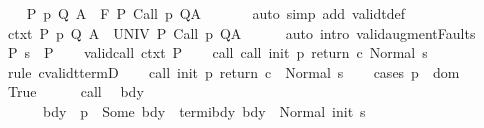 \begin{isabellebody}
\ \ \isamarkupfalse%
\ {\isachardoublequoteopen}{\isasymforall}{\isacharparenleft}P{\isacharcomma}\ p{\isacharcomma}\ Q{\isacharcomma}\ A{\isacharparenright}{\isasymin}{\isasymTheta}{\isachardot}\ {\isasymGamma}\ {\isasymTurnstile}\isactrlbsub {\isacharslash}F\isactrlesub \ P\ {\isacharparenleft}Call\ p{\isacharparenright}\ Q{\isacharcomma}A{\isachardoublequoteclose}\ \isanewline
\ \ \ \ \isamarkupfalse%
\ {\isacharparenleft}auto\ simp\ add{\isacharcolon}\ validt{\isacharunderscore}def{\isacharparenright}\isanewline
\ \ \isamarkupfalse%
\ \isamarkupfalse%
\ ctxt{\isacharprime}{\isacharcolon}\ {\isachardoublequoteopen}{\isasymforall}{\isacharparenleft}P{\isacharcomma}\ p{\isacharcomma}\ Q{\isacharcomma}\ A{\isacharparenright}{\isasymin}{\isasymTheta}{\isachardot}\ {\isasymGamma}\ {\isasymTurnstile}\isactrlbsub {\isacharslash}UNIV\isactrlesub \ P\ {\isacharparenleft}Call\ p{\isacharparenright}\ Q{\isacharcomma}A{\isachardoublequoteclose}\isanewline
\ \ \ \ \isamarkupfalse%
\ {\isacharparenleft}auto\ intro{\isacharcolon}\ valid{\isacharunderscore}augment{\isacharunderscore}Faults{\isacharparenright}\isanewline
\ \ \isamarkupfalse%
\ P{\isacharcolon}\ {\isachardoublequoteopen}s\ {\isasymin}\ P{\isachardoublequoteclose}\isanewline
\ \ \isamarkupfalse%
\ valid{\isacharunderscore}call\ ctxt\ P\isanewline
\ \ \isamarkupfalse%
\ call{\isacharcolon}\ {\isachardoublequoteopen}{\isasymGamma}{\isasymturnstile}call\ init\ p\ return{\isacharprime}\ c{\isasymdown}\ Normal\ s{\isachardoublequoteclose}\isanewline
\ \ \ \ \isamarkupfalse%
\ {\isacharparenleft}rule\ cvalidt{\isacharunderscore}termD{\isacharparenright}\isanewline
\ \ \isamarkupfalse%
\ {\isachardoublequoteopen}{\isasymGamma}{\isasymturnstile}call\ init\ p\ return\ c\ {\isasymdown}\ Normal\ s{\isachardoublequoteclose}\isanewline
\ \ \isamarkupfalse%
\ {\isacharparenleft}cases\ {\isachardoublequoteopen}p\ {\isasymin}\ dom\ {\isasymGamma}{\isachardoublequoteclose}{\isacharparenright}\isanewline
\ \ \ \ \isamarkupfalse%
\ True\isanewline
\ \ \ \ \isamarkupfalse%
\ call\ \isamarkupfalse%
\ bdy\ \ \isanewline
\ \ \ \ \ \ bdy{\isacharcolon}\ {\isachardoublequoteopen}{\isasymGamma}\ p\ {\isacharequal}\ Some\ bdy{\isachardoublequoteclose}\ \ termi{\isacharunderscore}bdy{\isacharcolon}\ {\isachardoublequoteopen}{\isasymGamma}{\isasymturnstile}bdy\ {\isasymdown}\ Normal\ {\isacharparenleft}init\ s{\isacharparenright}{\isachardoublequoteclose}\ \ \isanewline

\end{isabellebody}
